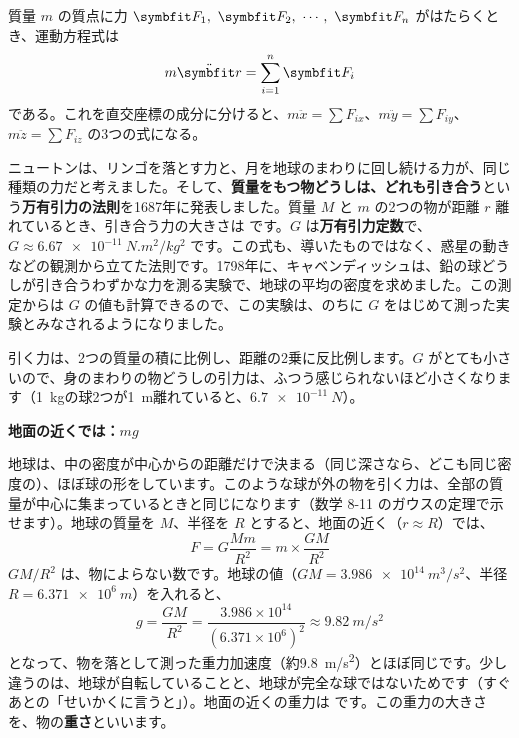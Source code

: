\begin{senmonsho}[運動方程式の書き方]
\begin{bkhonbun}
質量 $m$ の質点に力 $\symbfit F_1,\ \symbfit F_2,\ \cdots,\ \symbfit F_n$ がはたらくとき、運動方程式は
\[ m\ddot{\symbfit r}=\sum_{i=1}^{n}\symbfit F_i \]
である。これを直交座標の成分に分けると、$m\ddot x=\sum F_{ix}$、$m\ddot y=\sum F_{iy}$、$m\ddot z=\sum F_{iz}$ の3つの式になる。
\end{bkhonbun}
\end{senmonsho}


\leavevmode\label{ph:力-2:sec3}\label{ph:力-2:banyuu}ニュートンは、リンゴを落とす力と、月を地球のまわりに回し続ける力が、同じ種類の力だと考えました。そして、\textbf{質量をもつ物どうしは、どれも引き合う}という\textbf{万有引力の法則}を1687年に発表しました。質量 $M$ と $m$ の2つの物が距離 $r$ 離れているとき、引き合う力の大きさは
です。$G$ は\textbf{万有引力定数}で、$G\approx\qty{6.67e-11}{N.m^2/kg^2}$ です。この式も、導いたものではなく、惑星の動きなどの観測から立てた法則です。1798年に、キャベンディッシュは、鉛の球どうしが引き合うわずかな力を測る実験で、地球の平均の密度を求めました。この測定からは $G$ の値も計算できるので、この実験は、のちに $G$ をはじめて測った実験とみなされるようになりました。

\begin{phyomi}[$F=G\dfrac{Mm}{r^2}$]
引く力は、2つの質量の積に比例し、距離の2乗に反比例します。$G$ がとても小さいので、身のまわりの物どうしの引力は、ふつう感じられないほど小さくなります（\qty{1}{kg}の球2つが\qty{1}{m}離れていると、$\qty{6.7e-11}{N}$）。
\end{phyomi}

\noindent\textbf{地面の近くでは：$mg$}\par
\noindent\label{ph:力-2:omosa}地球は、中の密度が中心からの距離だけで決まる（同じ深さなら、どこも同じ密度の）、ほぼ球の形をしています。このような球が外の物を引く力は、全部の質量が中心に集まっているときと同じになります（数学 8-11 のガウスの定理で示せます）。地球の質量を $M$、半径を $R$ とすると、地面の近く（$r\approx R$）では、
\[ F=G\frac{Mm}{R^2}=m\times\frac{GM}{R^2} \]
$GM/R^2$ は、物によらない数です。地球の値（$GM=\qty{3.986e14}{m^3/s^2}$、半径 $R=\qty{6.371e6}{m}$）を入れると、
\[ g=\frac{GM}{R^2}=\frac{3.986\times10^{14}}{(6.371\times10^6)^2}\approx\qty{9.82}{m/s^2} \]
となって、物を落として測った重力加速度（約\qty{9.8}{m/s^2}）とほぼ同じです。少し違うのは、地球が自転していることと、地球が完全な球ではないためです（すぐあとの「せいかくに言うと」）。地面の近くの重力は
です。この重力の大きさを、物の\textbf{重さ}といいます。

